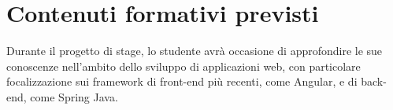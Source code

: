 \section*{Contenuti formativi previsti}
Durante il progetto di stage, lo studente avrà occasione di approfondire le sue 
conoscenze nell'ambito dello sviluppo di applicazioni web, con particolare focalizzazione 
sui framework di front-end più recenti, come Angular, e di back-end, come Spring Java.
\newpage